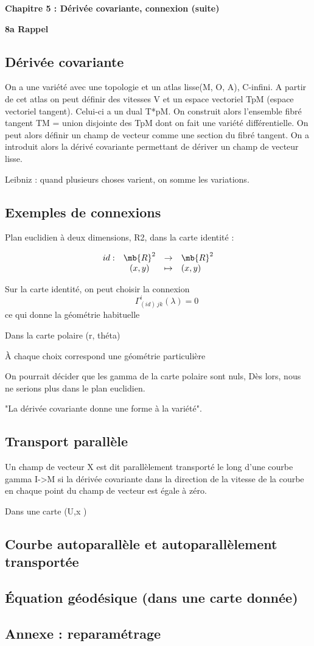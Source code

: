 

{\bf Chapitre 5 : Dérivée covariante, connexion (suite)}


{\bf 8a Rappel}
\subsection{Dérivée covariante}

On a une variété avec une topologie et un atlas lisse(M, O, A), C-infini. A partir de cet atlas on peut définir des vitesses V et un espace vectoriel TpM (espace vectoriel tangent). Celui-ci a un dual T*pM. On construit alors l'ensemble fibré tangent TM = union disjointe des TpM dont on fait une variété différentielle. On peut alors définir un champ de vecteur comme une section du fibré tangent. On a introduit alors la dérivé covariante permettant de dériver un champ de vecteur lisse. 

Leibniz : quand plusieurs choses varient, on somme les variations.

\subsection{Exemples de connexions}
Plan euclidien à deux dimensions, R2, dans la carte identité :
 
\[
\begin{array}{ l c l l }
 id : & \mb{R}^2 & \to & \mb{R}^2 \\ 
  & (x,y) & \mapsto & (x,y) \\
\end{array} 
\]

Sur la carte identité, on peut choisir la connexion
\[
\qquad \Gamma_{(id)\ jk}^i(\lambda)=0
\]
ce qui donne la géométrie habituelle

Dans la carte polaire (r, théta)

À chaque choix correspond une géométrie particulière

On pourrait décider que les gamma de la carte polaire sont nuls, Dès lors, nous ne serions plus dans le plan euclidien.

"La dérivée covariante donne une forme à la variété".

\subsection{Transport parallèle}
Un champ de vecteur X est dit parallèlement transporté le long d'une courbe gamma I->M si la dérivée covariante dans la direction de la vitesse de la courbe en chaque point du champ de vecteur est égale à zéro.

Dans une carte (U,x )
\subsection{Courbe autoparallèle et autoparallèlement transportée}
\subsection{Équation géodésique (dans une carte donnée)}
\subsection{Annexe : reparamétrage}
